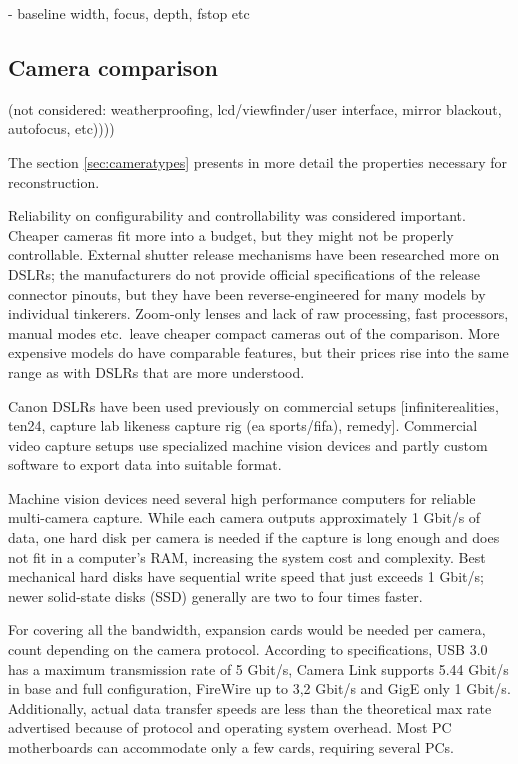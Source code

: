 - baseline width, focus, depth, fstop etc


\subsection{Camera comparison} %

(not considered: weatherproofing, lcd/viewfinder/user interface, mirror blackout, autofocus, etc))))

The section \ref{sec:cameratypes} presents in more detail the properties necessary for reconstruction.

Reliability on configurability and controllability was considered important.
Cheaper cameras fit more into a budget, but they might not be properly controllable.
External shutter release mechanisms have been researched more on DSLRs;
the manufacturers do not provide official specifications of the release connector pinouts, but they have been reverse-engineered for many models by individual tinkerers.
Zoom-only lenses and lack of raw processing, fast processors, manual modes etc.~leave cheaper compact cameras out of the comparison.
More expensive models do have comparable features, but their prices rise into the same range as with DSLRs that are more understood.

Canon DSLRs have been used previously on commercial setups [infiniterealities, ten24, capture lab likeness capture rig (ea sports/fifa), remedy].
Commercial video capture setups use specialized machine vision devices and partly custom software to export data into suitable format.

Machine vision devices need several high performance computers for reliable multi-camera capture.
While each camera outputs approximately 1 Gbit/s of data, one hard disk per camera is needed if the capture is long enough and does not fit in a computer's RAM, increasing the system cost and complexity.
Best mechanical hard disks have sequential write speed that just exceeds 1 Gbit/s;
newer solid-state disks (SSD) generally are two to four times faster.

For covering all the bandwidth, expansion cards would be needed per camera, count depending on the camera protocol. According to specifications, USB 3.0 has a maximum transmission rate of 5 Gbit/s, Camera Link supports 5.44 Gbit/s in base and full configuration, FireWire up to 3,2 Gbit/s and GigE only 1 Gbit/s.
Additionally, actual data transfer speeds are less than the theoretical max rate advertised because of protocol and operating system overhead.
Most PC motherboards can accommodate only a few cards, requiring several PCs.

